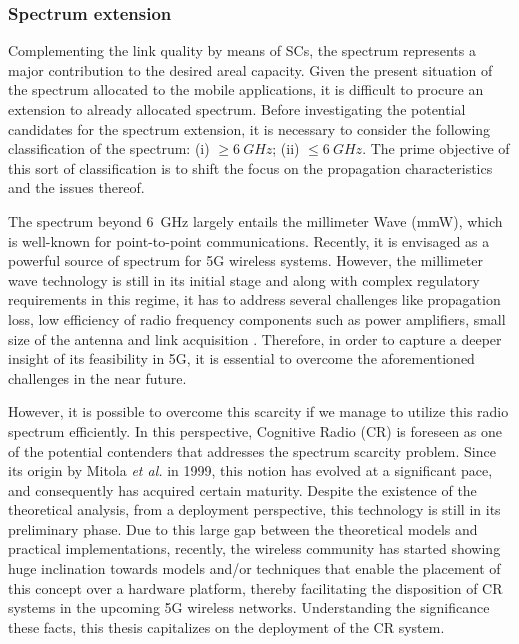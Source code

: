 \subsubsection*{Spectrum extension}
Complementing the link quality by means of SCs, the spectrum represents a major contribution to the desired areal capacity. Given the present situation of the spectrum allocated to the mobile applications, it is difficult to procure an extension to already allocated spectrum. Before investigating the potential candidates for the spectrum extension, it is necessary to consider the following classification of the spectrum:
(i) $\ge \SI{6}{GHz}$;
(ii) $\le \SI{6}{GHz}$.
The prime objective of this sort of classification is to shift the focus on the propagation characteristics and the issues thereof.


The spectrum beyond \SI{6}{GHz} largely entails the millimeter Wave (mmW), which is well-known for point-to-point communications. Recently, it is envisaged as a powerful source of spectrum for 5G wireless systems. However, the millimeter wave technology is still in its initial stage and along with complex regulatory requirements in this regime, it has to address several challenges like propagation loss, low efficiency of radio frequency components such as power amplifiers, small size of the antenna and link acquisition \cite{Rapp13}. Therefore, in order to capture a deeper insight of its feasibility in 5G, it is essential to overcome the aforementioned challenges in the near future.

 However, it is possible to overcome this scarcity if we manage to utilize this radio spectrum efficiently. In this perspective, Cognitive Radio (CR) is foreseen as one of the potential contenders that addresses the spectrum scarcity problem. Since its origin by Mitola \textit{et al.} in 1999, this notion has evolved at a significant pace, and consequently has acquired certain maturity. Despite the existence of the theoretical analysis, from a deployment perspective, this technology is still in its preliminary phase. Due to this large gap between the theoretical models and practical implementations, recently, the wireless community has started showing huge inclination towards models and/or techniques that enable the placement of this concept over a hardware platform, thereby facilitating the disposition of CR systems in the upcoming 5G wireless networks. Understanding the significance these facts, this thesis capitalizes on the deployment of the CR system. 

